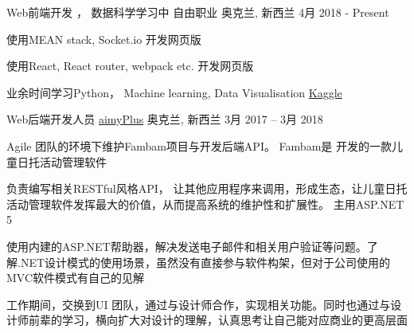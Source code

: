 
\begin{cventries}
	\cventry
	{Web前端开发 ， 数据科学学习中}
	{自由职业}
	{奥克兰, \enskip 新西兰}
	{4月 2018 - Present}
	{
		\begin{cvitems}
			\item {使用MEAN stack, Socket.io 开发网页版\href{https://github.com/ChenMu1/chatroom}{\color{deepblue}{在线聊天室}}
			\item{使用React, React router, webpack etc. 开发网页版\href{https://github.com/ChenMu1/amazing-react-app}{\color{deepblue}{前端单页管理仪表板}} 
			\item{业余时间学习Python， Machine learning, Data Visualisation \quad  \href{https://www.kaggle.com/chenmu1/kernels}{\color{deepblue} {Kaggle} }
		}
	 }
		}
		\end{cvitems}
	}
\end{cventries}

\begin{cventries}
	\cventry
	{Web后端开发人员}
	{\href{http://www.aimyplus.com/about}{aimyPlus}}
	{奥克兰, \enskip 新西兰}
	{3月 2017 – 3月 2018}
	{
		\begin{cvitems}
			\item{Agile 团队的环境下维护Fambam项目与开发后端API。 Fambam是 \href{http://www.aimyplus.com}{\color{deepblue}{aimyPlus}}开发的一款儿童日托活动管理软件}
			\item {负责编写相关RESTful风格API， 让其他应用程序来调用，形成生态，让儿童日托活动管理软件发挥最大的价值，从而提高系统的维护性和扩展性。 主用ASP.NET 5}
			\item{使用内建的ASP.NET帮助器，解决发送电子邮件和相关用户验证等问题。了解.NET设计模式的使用场景，虽然没有直接参与软件构架，但对于公司使用的MVC软件模式有自己的见解}
			\item {工作期间，交换到UI 团队，通过与设计师合作，实现相关功能。同时也通过与设计师前辈的学习，横向扩大对设计的理解，认真思考让自己能对应商业的更高层面}
		\end{cvitems}
	}
\end{cventries}




